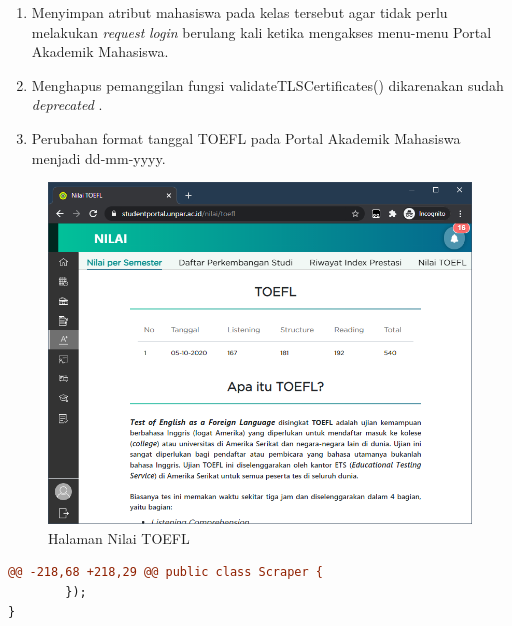 \begin{itemize}
        \begin{enumerate}
            \item Menyimpan atribut mahasiswa pada kelas tersebut agar tidak perlu melakukan \textit{request} \textit{login} berulang kali ketika mengakses menu-menu Portal Akademik Mahasiswa.
            \item Menghapus pemanggilan fungsi validateTLSCertificates() dikarenakan sudah \textit{deprecated} \cite{jsoup}.
            \item Perubahan format tanggal TOEFL pada Portal Akademik Mahasiswa menjadi dd-mm-yyyy.
        \end{enumerate}
       
       \begin{figure}[H]
        	\centering
        	\includegraphics[scale=0.45]{Gambar/nilai_toefl.png}
        	\caption{Halaman Nilai TOEFL} 
        	\label{fig:3_toefl}
        \end{figure}
        

        \begin{lstlisting}[language=diff, caption=Perubahan Implementasi Jsoup TOEFL, label=diff_toefl]
@@ -218,68 +218,29 @@ public class Scraper {
        });
}


\end{lstlisting}
\end{itemize}
